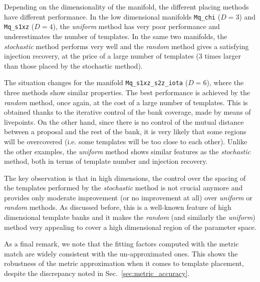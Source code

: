 \documentclass[twocolumn,showpacs,preprintnumbers,nofootinbib,prd,
superscriptaddress,10pt]{revtex4-2}
\begin{document}
Depending on the dimensionality of the manifold, the different placing methods have different performance.
In the low dimensional manifolds \texttt{Mq\_chi} ($D=3$) and \texttt{Mq\_s1xz} ($D=4$), the {\it uniform} method has very poor performance and underestimates the number of templates. In the same two manifolds, the {\it stochastic} method performs very well and the {\it random} method gives a satisfying injection recovery, at the price of a large number of templates (3 times larger than those placed by the stochastic method).

The situation changes for the manifold \texttt{Mq\_s1xz\_s2z\_iota} ($D=6$), where the three methods show similar properties. The best performance is achieved by the {\it random} method, once again, at the cost of a large number of templates.
This is obtained thanks to the iterative control of the bank coverage, made by means of livepoints. On the other hand, since there is no control of the mutual distance between a proposal and the rest of the bank, it is very likely that some regions will be overcovered (i.e. some templates will be too close to each other).
Unlike the other examples, the {\it uniform} method shows similar features as the {\it stochastic} method, both in terms of template number and injection recovery.

The key observation is that in high dimensions, the control over the spacing of the templates performed by the {\it stochastic} method is not crucial anymore and provides only moderate improvement (or no improvement at all) over {\it uniform} or {\it random} methods. As discussed before, this is a well-known feature \cite{Messenger:2008ta, Allen:2021yuy, Allen:2022lqr} of high dimensional template banks and it makes the {\it random} (and similarly the {\it uniform}) method very appealing to cover a high dimensional region of the parameter space.

As a final remark, we note that the fitting factors computed with the metric match are widely consistent with the un-approximated ones. This shows the robustness of the metric approximation when it comes to template placement, despite the discrepancy noted in Sec.~\ref{sec:metric_accuracy}.
\end{document}
